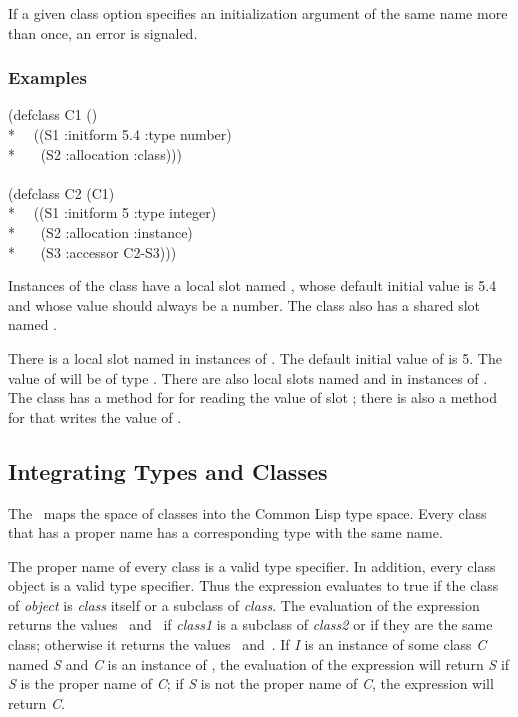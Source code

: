If a given  class option specifies an
initialization argument of the same name more than once, an
error is signaled.

\subsubsection{Examples}

\begin{lisp}
(defclass C1 () \\*
~~((S1 :initform 5.4 :type number) \\*
~~~(S2 :allocation :class))) \\
\\
(defclass C2 (C1) \\*
~~((S1 :initform 5 :type integer)\\*
~~~(S2 :allocation :instance)\\*
~~~(S3 :accessor C2-S3)))
\end{lisp}

Instances of the class  have a local slot named , whose default
initial value is 5.4 and whose value should always be a number.
The class  also has a shared slot named .

There is a local slot named  in instances of .  The
default initial value of  is 5.  The value of  will be
of type .  There are also local slots named
 and  in instances of .  The class 
has a method for  for reading the value of slot ;
there is also a method for  that writes the
value of .


\subsection{Integrating Types and Classes} 
\label{Integrating-Types-and-Classes-SECTION} 

The \CLOS\ maps the space of classes into the Common Lisp type space.
Every class that has a proper name has a corresponding type with the same 
name.  

The proper name of every class is a valid type specifier.  In
addition, every class object is a valid type specifier.  Thus the
expression  evaluates to true if the
class of \emph{object\/} is \emph{class\/} itself or a subclass of {\it
class}.  The evaluation of the expression  returns the values ~and~ if \emph{class1\/} is a
subclass of \emph{class2\/} or if they are the same class; otherwise it
returns the values ~and~.  If \emph{I} is an instance of some class
\emph{C} named \emph{S} and \emph{C} is an instance of , the
evaluation of the expression  will return \emph{S} if
\emph{S} is the proper name of \emph{C\/}; if \emph{S} is not the proper
name of \emph{C}, the expression  will
return \emph{C}.

